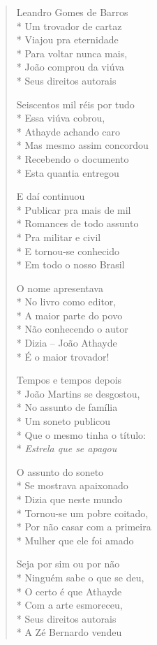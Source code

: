 \begin{verse}
Leandro Gomes de Barros\\*
Um trovador de cartaz\\*
Viajou pra eternidade\\*
Para voltar nunca mais,\\*
João comprou da viúva\\*
Seus direitos autorais

Seiscentos mil réis por tudo\\*
Essa viúva cobrou,\\*
Athayde achando caro\\*
Mas mesmo assim concordou\\*
Recebendo o documento\\*
Esta quantia entregou

E daí continuou\\*
Publicar pra mais de mil\\*
Romances de todo assunto\\*
Pra militar e civil\\*
E tornou-se conhecido\\*
Em todo o nosso Brasil

O nome apresentava\\*
No livro como editor,\\*
A maior parte do povo\\*
Não conhecendo o autor\\*
Dizia -- João Athayde\\*
É o maior trovador!

Tempos e tempos depois\\*
João Martins se desgostou,\\*
No assunto de família\\*
Um soneto publicou\\*
Que o mesmo tinha o título:\\*
\textit{Estrela que se apagou}

O assunto do soneto\\*
Se mostrava apaixonado\\*
Dizia que neste mundo\\*
Tornou-se um pobre coitado,\\*
Por não casar com a primeira\\*
Mulher que ele foi amado

Seja por sim ou por não\\*
Ninguém sabe o que se deu,\\*
O certo é que Athayde\\*
Com a arte esmoreceu,\\*
Seus direitos autorais\\*
A Zé Bernardo vendeu


\end{verse}

